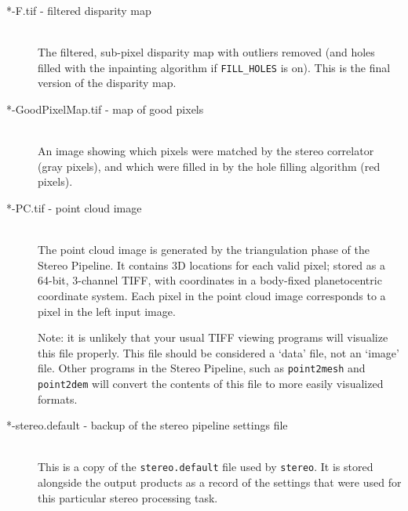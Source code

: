 \begin{description}
\item[*-F.tif \textnormal{- filtered disparity map}] \hfill \\
  The filtered, sub-pixel disparity map with outliers removed (and
  holes filled with the inpainting algorithm if \texttt{FILL\_HOLES}
  is on). This is the final version of the disparity map.

\item[*-GoodPixelMap.tif \textnormal{- map of good pixels}] \hfill \\
  An image showing which pixels were matched by the stereo correlator
  (gray pixels), and which were filled in by the hole filling
  algorithm (red pixels).

\item[*-PC.tif \textnormal{- point cloud image}] \hfill \\
  The point cloud image is generated by the triangulation phase of the
  Stereo Pipeline.  It contains 3D locations for each valid pixel;
  stored as a 64-bit, 3-channel TIFF, with coordinates in a body-fixed
  planetocentric coordinate system.  Each pixel in the point cloud
  image corresponds to a pixel in the left input image.

  Note: it is unlikely that your usual TIFF viewing programs will
  visualize this file properly.  This file should be considered a
  `data' file, not an `image' file.  Other programs in the Stereo
  Pipeline, such as {\tt point2mesh} and {\tt point2dem} will convert
  the contents of this file to more easily visualized formats.

\item[*-stereo.default \textnormal{- backup of the stereo pipeline settings file}] \hfill \\ 
  This is a copy of the \texttt{stereo.default} file used by
  \texttt{stereo}.  It is stored alongside the output products as
  a record of the settings that were used for this particular stereo
  processing task.

\end{description}
